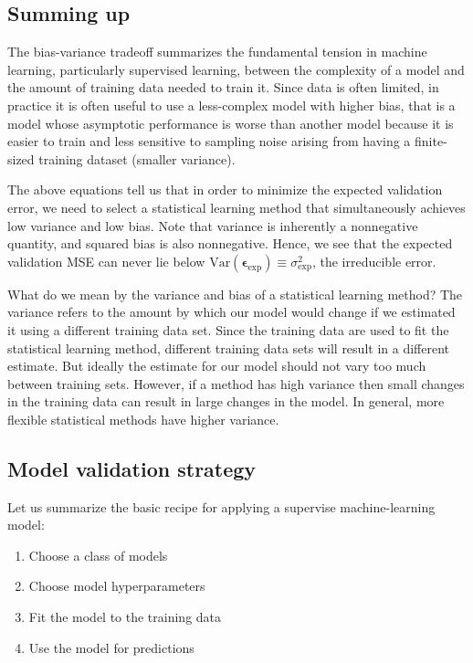 \documentclass[%
oneside,                 %
final,                   %
10pt]{article}
\begin{document}
\subsection{Summing up}


The bias-variance tradeoff summarizes the fundamental tension in
machine learning, particularly supervised learning, between the
complexity of a model and the amount of training data needed to train
it.  Since data is often limited, in practice it is often useful to
use a less-complex model with higher bias, that is  a model whose asymptotic
performance is worse than another model because it is easier to
train and less sensitive to sampling noise arising from having a
finite-sized training dataset (smaller variance). 



The above equations tell us that in
order to minimize the expected validation error, we need to select a
statistical learning method that simultaneously achieves low variance
and low bias. Note that variance is inherently a nonnegative quantity,
and squared bias is also nonnegative. Hence, we see that the expected
validation MSE can never lie below $\mathrm{Var}(\bm{\epsilon}_\mathrm{exp}) \equiv \sigma^2_\mathrm{exp}$, the irreducible error.


What do we mean by the variance and bias of a statistical learning
method? The variance refers to the amount by which our model would change if we
estimated it using a different training data set. Since the training
data are used to fit the statistical learning method, different
training data sets  will result in a different estimate. But ideally the
estimate for our model should not vary too much between training
sets. However, if a method has high variance  then small changes in
the training data can result in large changes in the model. In general, more
flexible statistical methods have higher variance.


\subsection{Model validation strategy}

Let us summarize the basic recipe for applying a supervise machine-learning model:

\begin{enumerate}
 \item Choose a class of models

 \item Choose model hyperparameters

 \item Fit the model to the training data

 \item Use the model for predictions
\end{enumerate}
\end{document}
